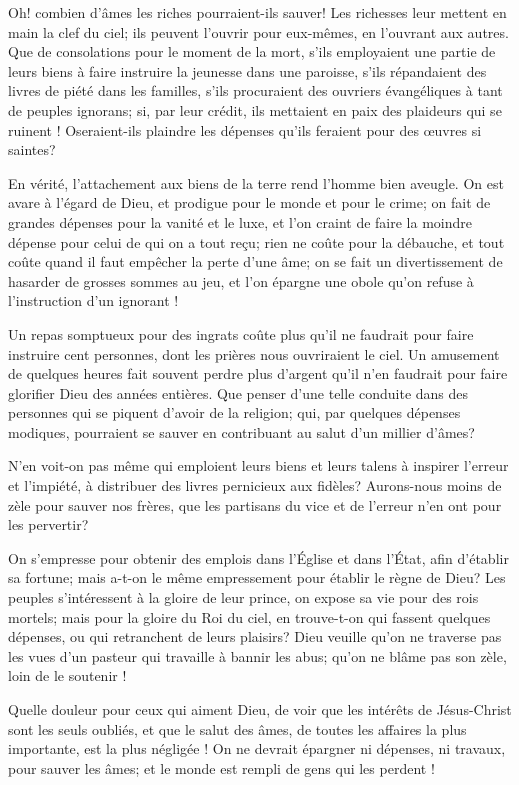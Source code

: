 \documentclass[instructions.tex]{subfiles}
\begin{document}
Oh! combien d’âmes les riches pourraient-ils sauver! Les richesses leur mettent en main la clef du ciel; ils peuvent l’ouvrir pour eux-mêmes, en l’ouvrant aux autres. Que de consolations pour le moment de la mort, s’ils employaient une partie de leurs biens à faire instruire la jeunesse dans une paroisse, s’ils répandaient des livres de piété dans les familles, s’ils procuraient des ouvriers évangéliques à tant de peuples ignorans; si, par leur crédit, ils mettaient en paix des plaideurs qui se ruinent ! Oseraient-ils plaindre les dépenses qu’ils feraient pour des œuvres si saintes?
 
En vérité, l’attachement aux biens de la terre rend l’homme bien aveugle. On est avare à l’égard de Dieu, et prodigue pour le monde et pour le crime; on fait de grandes dépenses pour la vanité et le luxe, et l’on craint de faire la moindre dépense pour celui de qui on a tout reçu; rien ne coûte pour la débauche, et tout coûte quand il faut empêcher la perte d’une âme; on se fait un divertissement de hasarder de grosses sommes au jeu, et l’on épargne une obole qu’on refuse à l’instruction d’un ignorant !
 
Un repas somptueux pour des ingrats coûte plus qu’il ne faudrait pour faire instruire cent personnes, dont les prières nous ouvriraient le ciel. Un amusement de quelques heures fait souvent perdre plus d’argent qu’il n’en faudrait pour faire glorifier Dieu des années entières. Que penser d’une telle conduite dans des personnes qui se piquent d’avoir de la religion; qui, par quelques dépenses modiques, pourraient se sauver en contribuant au salut d’un millier d’âmes?
 
N’en voit-on pas même qui emploient leurs biens et leurs talens à inspirer l’erreur et l’impiété, à distribuer des livres pernicieux aux fidèles? Aurons-nous moins de zèle pour sauver nos frères, que les partisans du vice et de l’erreur n’en ont pour les pervertir?
 
On s’empresse pour obtenir des emplois dans l’Église et dans l’État, afin d’établir sa fortune; mais a-t-on le même empressement pour établir le règne de Dieu? Les peuples s’intéressent à la gloire de leur prince, on expose sa vie pour des rois mortels; mais pour la gloire du Roi du ciel, en trouve-t-on qui fassent quelques dépenses, ou qui retranchent de leurs plaisirs? Dieu veuille qu’on ne traverse pas les vues d’un pasteur qui travaille à bannir les abus; qu’on ne blâme pas son zèle, loin de le soutenir !
 
Quelle douleur pour ceux qui aiment Dieu, de voir que les intérêts de Jésus-Christ sont les seuls oubliés, et que le salut des âmes, de toutes les affaires la plus importante, est la plus négligée ! On ne devrait épargner ni dépenses, ni travaux, pour sauver les âmes; et le monde est rempli de gens qui les perdent !
 
\end{document}

